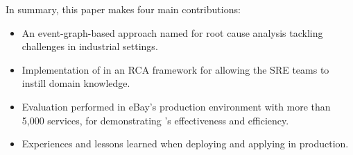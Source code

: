 In summary, this paper makes four main contributions:
\begin{itemize}
    \item An event-graph-based approach named \system for root cause analysis tackling challenges in industrial settings.
    \item Implementation of \system in an RCA framework for allowing the SRE teams to instill domain knowledge.
    \item Evaluation performed in eBay's production environment with more than 5,000 services, for demonstrating \system's effectiveness and efficiency.
    \item Experiences and lessons learned when deploying and applying \system in production.
\end{itemize}


